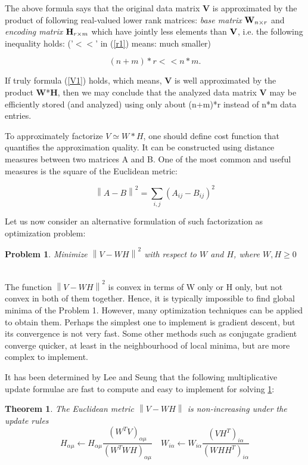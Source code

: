 \documentclass[conference]{IEEEtran}
\newcommand{\beq}{\begin{equation}}
\newcommand{\eeq}{\end{equation}}
\newcommand{\norm}[1]{\left\lVert#1\right\rVert}
\newtheorem{problem}{Problem}
\newtheorem{theorem}{Theorem}
\begin{document}
The above formula says  that the original data matrix \textbf{V} is
approximated by the product of following real-valued lower rank matrices: \emph{base matrix} ${\bf
W}_{n\times r}$ and \emph{encoding matrix} ${\bf H}_{r\times m}$  which have jointly less
elements than ${\bf V}$, i.e. the following inequality holds:
('$< <$' in (\ref{r1}) means: much smaller)

\begin{equation}\label{r1}
    (n+m)*r<\hspace{1pt}< n*m . 
\end{equation}

If truly formula (\ref{V1}) holds, which means, {\bf V} is well
approximated by the product {\bf W}*{\bf H}, then we may conclude that the
analyzed data matrix {\bf V} may be efficiently stored (and analyzed)
using only about (n+m)*r instead  of n*m data entries.

To approximately factorize $V\simeq{W*H}$, one should define cost function
that quantifies the approximation quality. It can be constructed
using distance measures between two matrices A and B. One of the most common and useful
measures is the square of the Euclidean metric:

\beq  
\norm{A-B}^2=\sum_{i,j}\left(A_{ij}-B_{ij} \right)^2
\eeq

Let us now consider an alternative formulation of such factorization as optimization problem: 
\newline
\begin{problem}
\label{prob:1}
Minimize $\norm{V-WH}^2$ with respect to $W$ and $H$, where $W,H \geq 0$
\end{problem}
~\\

The function $\norm{V-WH}^2$ is convex in terms of W only or H only, but not convex in both of them together. Hence, it is typically impossible to find global minima of the Problem 1. However, many optimization techniques can be applied to obtain them.
Perhaps the simplest one to implement is gradient descent, but its convergence is not very fast. Some other methods such as conjugate gradient converge quicker, at least in the neighbourhood of local minima, but are more complex to implement.

It has been determined by Lee and Seung that the following multiplicative update formulae are fast to compute and easy to implement for solving \ref{prob:1}:
\newline
\begin{theorem}
The Euclidean metric $\norm{V-WH}$ is non-increasing under the update rules 
\begin{equation}
    H_{\alpha\mu} \leftarrow H_{\alpha\mu}\frac{(W^TV)_{\alpha\mu}}{(W^TWH)_{\alpha\mu}} \quad
    W_{i\alpha} \leftarrow W_{i\alpha}\frac{(VH^T)_{i\alpha}}{(WHH^T)_{i\alpha}}
\end{equation}
\end{theorem}
~\\
\end{document}
